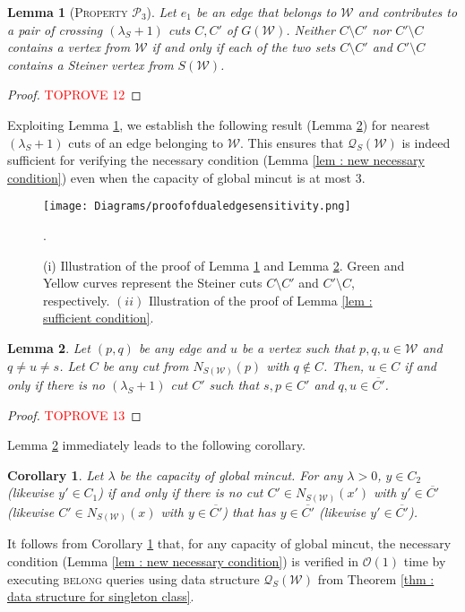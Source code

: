 \documentclass[letterpaper,11pt]{article}
\newtheorem{corollary}{Corollary}[]
\newtheorem{lemma}{Lemma}[]
\begin{document}
\begin{lemma} [\textsc{Property ${\mathcal P}_3$}] \label{lem : property p3}
    Let $e_1$ be an edge that belongs to ${\mathcal W}$ and contributes to a pair of crossing $(\lambda_S+1)$ cuts $C,C'$ of $G({\mathcal W})$. Neither $C\setminus C'$ nor $C'\setminus C$ contains a vertex from ${\mathcal W}$ if and only if each of the two sets $C\setminus C'$ and $C'\setminus C$ contains a Steiner vertex from $S({\mathcal W})$.
\end{lemma} 
\begin{proof}\textcolor{red}{TOPROVE 12}\end{proof}
Exploiting Lemma \ref{lem : property p3}, we establish the following result (Lemma \ref{lem : necessary condition}) for nearest $(\lambda_S+1)$ cuts of an edge belonging to ${\mathcal W}$. This ensures that ${\mathcal Q}_S({\mathcal W})$ is indeed sufficient for verifying the necessary condition (Lemma \ref{lem : new necessary condition}) even when the capacity of global mincut is at most $3$.
\begin{figure}
 \centering
    \texttt{[image: Diagrams/proofofdualedgesensitivity.png]} 
   \caption{(i) Illustration of the proof of Lemma \ref{lem : property p3} and Lemma \ref{lem : necessary condition}. Green and Yellow curves represent the Steiner cuts $C\setminus C'$ and $C'\setminus C$, respectively. $(ii)$ Illustration of the proof of Lemma \ref{lem : sufficient condition}.}
  \label{fig : proof}. 
\end{figure}
\begin{lemma} \label{lem : necessary condition}
    Let $(p,q)$ be any edge and $u$ be a vertex such that $p,q,u\in {\mathcal W}$ and $q\ne u\ne s$. Let $C$ be any cut from $N_{S({\mathcal W})}(p)$ with $q\notin C$. Then, $u\in C$ if and only if there is no $(\lambda_S+1)$ cut $C'$ such that $s,p\in C'$ and $q,u\in \overline{C'}$.  
\end{lemma}
\begin{proof}\textcolor{red}{TOPROVE 13}\end{proof}


Lemma \ref{lem : necessary condition} immediately leads to the following corollary.
\begin{corollary} \label{cor : necessary condition}
    Let $\lambda$ be the capacity of global mincut. For any $\lambda>0$, $y\in C_2$ (likewise $y'\in C_1$) if and only if there is no cut $C'\in N_{S({\mathcal W})}(x')$ with $y'\in \overline{C'}$ (likewise $C'\in N_{S({\mathcal W})}(x)$ with $y\in \overline{C'}$) that has $y\in \overline{C'}$ (likewise $y'\in \overline{C'}$). 
\end{corollary}
It follows from Corollary \ref{cor : necessary condition} that, for any capacity of global mincut, the necessary condition (Lemma \ref{lem : new necessary condition}) is verified in ${\mathcal O}(1)$ time by executing \textsc{belong} queries using data structure ${\mathcal Q}_S({\mathcal W})$ from Theorem \ref{thm : data structure for singleton class}.  
\end{document}
